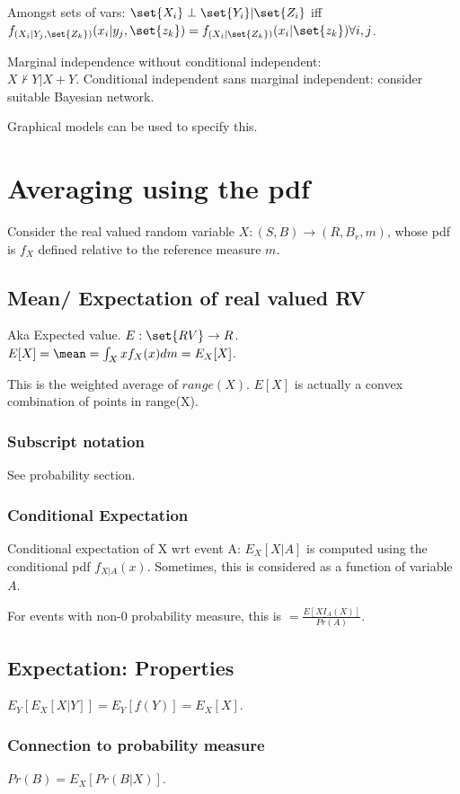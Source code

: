 \documentclass[oneside, article]{memoir}
\begin{document}
Amongst sets of vars: $\set{X_{i}} \perp \set{Y_{i}}|\set{Z_{i}}$ iff \\
$f_{(X_{i}|Y_{j},\set{Z_{k}})}(x_{i}|y_{j},\set{z_{k}}) = f_{(X_{i}|\set{Z_{k}})}(x_{i}|\set{z_{k}}) \forall i, j$.

Marginal independence without conditional independent: \\
$X \nvdash Y| X+Y$. Conditional independent sans marginal independent: consider suitable Bayesian network.

Graphical models can be used to specify this.


\chapter{Averaging using the pdf}
Consider the real valued random variable $X: (S, B) \to (R, B_r, m)$, whose pdf is $f_X$ defined relative to the reference measure $m$.

\section{Mean/ Expectation of real valued RV}
Aka Expected value. $E:\set{RV} \to R$. $E[X] = \mean = \int_{X} x f_X(x) dm = E_{X}[X]$.

This is the weighted average of $range(X)$. $E[X]$ is actually a convex combination of points in range(X).

\subsection{Subscript notation}
See probability section.

\subsection{Conditional Expectation}
Conditional expectation of X wrt event A: $E_{X}[X|A]$ is computed  using the conditional pdf $f_{X|A}(x)$. Sometimes, this is considered as a function of variable $A$.

For events with non-0 probability measure, this is $= \frac{E[X I_A(X)]}{Pr(A)}$.

\section{Expectation: Properties}
$E_Y[E_{X}[X|Y]]= E_Y[f(Y)] = E_{X}[X]$.

\subsection{Connection to probability measure}
$Pr(B) = E_{X}[Pr(B|X)]$.
\end{document}
